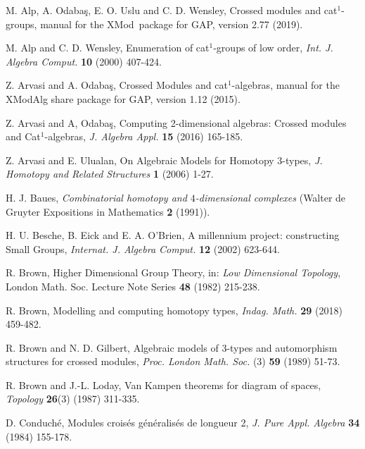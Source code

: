 \documentclass{ws-ijac}
\newcommand{\GAP}      {{\sf GAP}}
\newcommand{\XMod}     {{\sf XMod}}
\begin{document}
\begin{thebibliography}{0}

	 {M. Alp}, {A. Odaba\c{s}}, 
	               {E. O. Uslu} and {C. D. Wensley},   
	{Crossed modules and cat$^{1}$-groups}, 
	manual for the \XMod\ package for \textsf{GAP}, version 2.77 (2019). 
	
	 {M. Alp} and {C. D. Wensley}, 
	{Enumeration of cat$^{1}$-groups of low order}, 
	 {\it Int. J. Algebra Comput.} {\bf 10} (2000) 407-424.
	
	 {Z. Arvasi} and {A. Odaba\c{s}},  
	Crossed Modules and cat$^1$-algebras, 
	manual for the \textsf{XModAlg} share package for \GAP, version 1.12 (2015). 
	
	 {Z. Arvasi} and {A, Odaba\c{s}}, 
	{Computing 2-dimensional algebras: Crossed modules and Cat$^1$-algebras}, 
	 {\it J. Algebra Appl.} {\bf 15} (2016) 165-185.
	
	 {Z. Arvasi} and {E. Ulualan}, 
	{On Algebraic Models for Homotopy $3$-types}, 
	 {\it J. Homotopy and Related Structures} {\bf 1} (2006) 1-27.
		
	 {H. J. Baues}, 
	 {\it Combinatorial homotopy and $4$-dimensional complexes} 
	(Walter de Gruyter Expositions in Mathematics {\bf 2} (1991)).
	
	{H. U. Besche}, {B. Eick} and {E. A. O'Brien}, 
	{A millennium project: constructing Small Groups}, 
	 {\it Internat. J. Algebra Comput.} {\bf 12} (2002) 623-644.
	
	 {R. Brown}, 
	{Higher Dimensional Group Theory}, 
	in:  {\it Low Dimensional Topology}, 
	London Math. Soc. Lecture Note Series {\bf 48} (1982) 215-238.
	
	 {R. Brown}, 
	{Modelling and computing homotopy types}, 
	{\it Indag. Math.} {\bf 29} (2018) 459-482.
	
	 {R. Brown} and {N. D. Gilbert}, 
	{Algebraic models of $3$-types and automorphism structures 
	for crossed modules}, 
	{\it Proc. London Math. Soc.} (3) {\bf 59} (1989) 51-73.
	
	 {R. Brown} and {J.-L. Loday}, 
	{Van Kampen theorems for diagram of spaces}, 
	{\it Topology} {\bf 26}(3) (1987) 311-335.
	
	 {D. Conduch\'{e}}, 
	{Modules crois{\'{e}}s g{\'{e}}n{\'{e}}ralis{\'{e}}s de longueur 2,} 
	{\it J. Pure Appl. Algebra} {\bf 34} (1984) 155-178.
	

\end{thebibliography}
\end{document}
